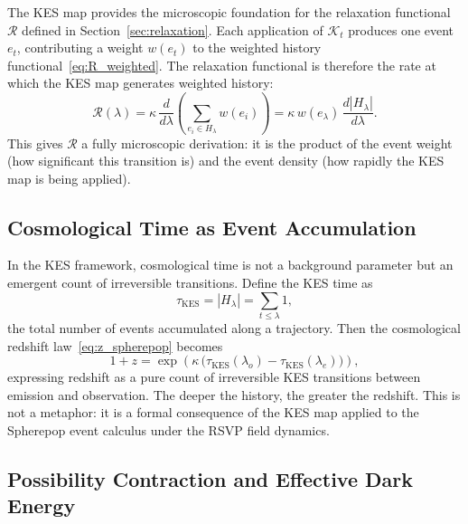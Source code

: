 \documentclass[12pt,a4paper]{article}
\theoremstyle{remark}
\newcommand{\Rcal}{\mathcal{R}}
\begin{document}
The KES map provides the microscopic foundation for the relaxation functional
$\Rcal$ defined in Section~\ref{sec:relaxation}. Each application of
$\mathcal{K}_t$ produces one event $e_t$, contributing a weight $w(e_t)$
to the weighted history functional~\eqref{eq:R_weighted}. The relaxation
functional is therefore the rate at which the KES map generates weighted
history:
\begin{equation}
\Rcal(\lambda) = \kappa\,\frac{d}{d\lambda}\!\left(\sum_{e_i \in H_\lambda} w(e_i)\right)
= \kappa\,w(e_\lambda)\,\frac{d|H_\lambda|}{d\lambda}.
\label{eq:kes_R}
\end{equation}
This gives $\Rcal$ a fully microscopic derivation: it is the product of the
event weight (how significant this transition is) and the event density (how
rapidly the KES map is being applied).

\subsection{Cosmological Time as Event Accumulation}

In the KES framework, cosmological time is not a background parameter but an
emergent count of irreversible transitions. Define the KES time as
\begin{equation}
\tau_{\mathrm{KES}} = |H_\lambda| = \sum_{t \le \lambda} 1,
\end{equation}
the total number of events accumulated along a trajectory. Then the
cosmological redshift law~\eqref{eq:z_spherepop} becomes
\begin{equation}
1 + z = \exp\!\left(\kappa\,\bigl(\tau_{\mathrm{KES}}(\lambda_o) -
\tau_{\mathrm{KES}}(\lambda_e)\bigr)\right),
\label{eq:z_kes}
\end{equation}
expressing redshift as a pure count of irreversible KES transitions between
emission and observation. The deeper the history, the greater the redshift.
This is not a metaphor: it is a formal consequence of the KES map applied to
the Spherepop event calculus under the RSVP field dynamics.

\subsection{Possibility Contraction and Effective Dark Energy}
\end{document}

